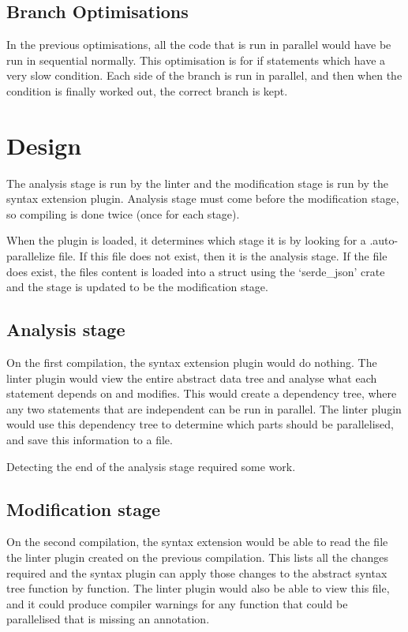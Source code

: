 \documentclass[conference]{IEEEtran}
\begin{document}
\subsection{Branch Optimisations}
In the previous optimisations, all the code that is run in parallel would have be run in sequential normally. This optimisation is for if statements which have a very slow condition. Each side of the branch is run in parallel, and then when the condition is finally worked out, the correct branch is kept.

\section{Design}
The analysis stage is run by the linter and the modification stage is run by the syntax extension plugin. Analysis stage must come before the modification stage, so compiling is done twice (once for each stage).

When the plugin is loaded, it determines which stage it is by looking for a .auto-parallelize file. If this file does not exist, then it is the analysis stage. If the file does exist, the files content is loaded into a struct using the `serde\_json' crate and the stage is updated to be the modification stage.

\subsection{Analysis stage}
On the first compilation, the syntax extension plugin would do nothing. The linter plugin would view the entire abstract data tree and analyse what each statement depends on and modifies. This would create a dependency tree, where any two statements that are independent can be run in parallel. The linter plugin would use this dependency tree to determine which parts should be parallelised, and save this information to a file.

Detecting the end of the analysis stage required some work.

\subsection{Modification stage}
On the second compilation, the syntax extension would be able to read the file the linter plugin created on the previous compilation. This lists all the changes required and the syntax plugin can apply those changes to the abstract syntax tree function by function. The linter plugin would also be able to view this file, and it could produce compiler warnings for any function that could be parallelised that is missing an annotation.

\printbibliography
\end{document}
